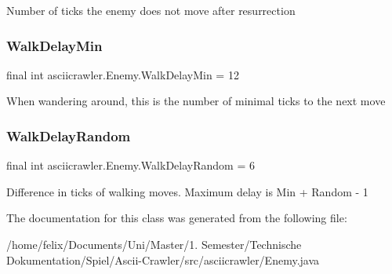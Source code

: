 Number of ticks the enemy does not move after resurrection \mbox{\label{classasciicrawler_1_1Enemy_a90ed20929053611dcb72a406b51d38c7}} 
\subsubsection{\texorpdfstring{Walk\+Delay\+Min}{WalkDelayMin}}
{\footnotesize\ttfamily final int asciicrawler.\+Enemy.\+Walk\+Delay\+Min = 12\hspace{0.3cm}{\ttfamily [static]}}

When wandering around, this is the number of minimal ticks to the next move \mbox{\label{classasciicrawler_1_1Enemy_ab726ddd8887f94387edf105358a034a3}} 
\subsubsection{\texorpdfstring{Walk\+Delay\+Random}{WalkDelayRandom}}
{\footnotesize\ttfamily final int asciicrawler.\+Enemy.\+Walk\+Delay\+Random = 6\hspace{0.3cm}{\ttfamily [static]}}

Difference in ticks of walking moves. Maximum delay is Min + Random -\/ 1 

The documentation for this class was generated from the following file\+:\begin{DoxyCompactItemize}
\item 
/home/felix/\+Documents/\+Uni/\+Master/1. Semester/\+Technische Dokumentation/\+Spiel/\+Ascii-\/\+Crawler/src/asciicrawler/Enemy.\+java\end{DoxyCompactItemize}
